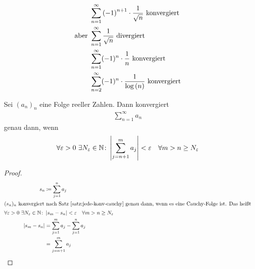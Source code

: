 \begin{beispiel}
    \begin{align*}
        &\sum_{n=1}^{\infty} \left(-1\right)^{n+1} \cdot \frac{1}{\sqrt{n}}\text{ konvergiert}\\
        \text{aber } &\sum_{n=1}^{\infty} \frac{1}{\sqrt {n}} \text{ divergiert}\\
        &\sum_{n=1}^{\infty} (-1)^{n} \cdot \frac{1}{n}\text{ konvergiert}\\
        &\sum_{n=2}^{\infty} (-1)^n \cdot \frac{1}{\log\left(n\right)}\text{ konvergiert}
    \end{align*}
\end{beispiel}

\begin{satz} %
    \label{satz:cauchy-kriterium}
    Sei $(a_n)_n$ eine Folge reeller Zahlen. Dann konvergiert
    \begin{align*}
        \sum_{n=1}^{\infty} a_n
    \end{align*}
    genau dann, wenn
    \begin{align*}
        \forall \varepsilon > 0~\exists N_{\varepsilon}\in\mathbb{N}\colon \left\lvert\sum_{j=n+1}^{m} a_j\right\rvert <\varepsilon\quad\forall m>n\geq N_{\varepsilon}
    \end{align*}
    \begin{proof}
        \begin{align*}
            s_n &\coloneqq \sum_{j=1}^{n} a_j\\
            \intertext{$(s_n)_n$ konvergiert nach Satz~\ref{satz:jede-konv-cauchy} genau dann, wenn es eine Cauchy-Folge ist. Das heißt}
            \forall\varepsilon > 0~\exists N_{\varepsilon}\in\mathbb{N}\colon &\left\lvert s_{m} - s_{n}\right\rvert < \varepsilon\quad\forall m> n \geq N_{\varepsilon}\\
            \left\lvert s_m - s_n\right\rvert &= \sum_{j=1}^{m} a_j - \sum_{j=1}^{n} a_j\\
            &= \sum_{j=n+1}^{m} a_j\qedhere
        \end{align*}
    \end{proof}
\end{satz}

